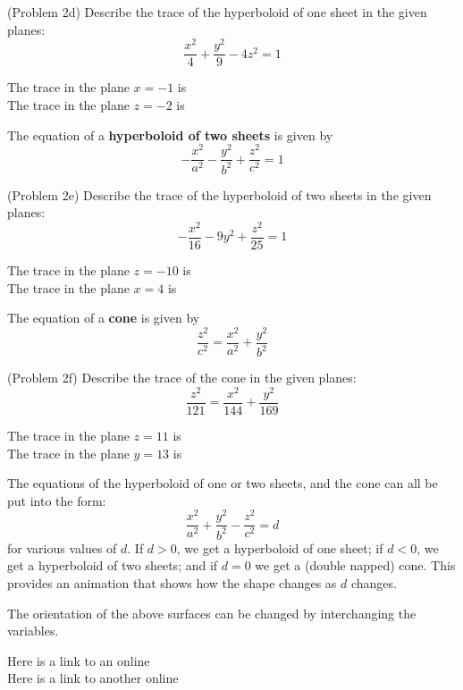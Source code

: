 \documentclass[handout]{ximera}
\begin{document}
\begin{problem}(Problem 2d)
Describe the trace of the hyperboloid of one sheet in the given planes:
\[
\frac{x^2}{4} + \frac{y^2}{9} - 4z^2 = 1
\]

The trace in the plane $x = -1$ is \\
The trace in the plane $z = -2$ is \\
\end{problem}

The equation of a \textbf{hyperboloid of two sheets} is given by 
\[
-\frac{x^2}{a^2} -\frac{y^2}{b^2} + \frac{z^2}{c^2} = 1
\]


\begin{problem}(Problem 2e)
Describe the trace of the hyperboloid of two sheets in the given planes:
\[
-\frac{x^2}{16} - 9y^2 + \frac{z^2}{25} = 1
\]

The trace in the plane $z = -10$ is \\
The trace in the plane $x = 4$ is 
\end{problem}



The equation of a \textbf{cone} is given by 
\[
\frac{z^2}{c^2} = \frac{x^2}{a^2} + \frac{y^2}{b^2}
\]

\begin{problem}(Problem 2f)
Describe the trace of the cone in the given planes:
\[
\frac{z^2}{121} = \frac{x^2}{144} + \frac{y^2}{169}
\]

The trace in the plane $z = 11$ is \\
The trace in the plane $y = 13$ is 
\end{problem}


The equations of the hyperboloid of one or two sheets, and the cone can all be put into the form:
\[
 \frac{x^2}{a^2} + \frac{y^2}{b^2} - \frac{z^2}{c^2} = d
\]
for various values of $d$.  If $d > 0$, we get a hyperboloid of one sheet; if $d< 0$, we get a 
hyperboloid of two sheets; and if $d= 0$ we get a (double napped) cone.
This  provides an 
animation that shows how the shape changes as $d$ changes.\\


\begin{remark}
The orientation of the above surfaces can be changed by interchanging the variables.
\end{remark}

Here is a link to an online \\
Here is a link to another online 
\end{document}
